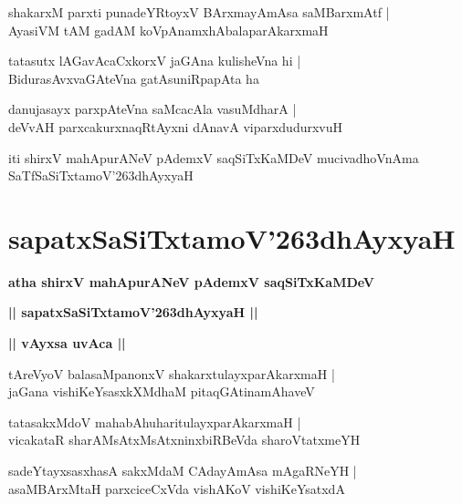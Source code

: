 \documentclass[twoside,12pt,openright]{book}
\def\S{\char'263}
\newcounter{shloka}[chapter]
\def\uvaca#1{\centerline{{\large\textbf{#1}}}}
\begin{document}
\begin{shloka}%
shakarxM parxti punadeYRtoyxV BArxmayAmAsa saMBarxmAtf |\\
AyasiVM tAM gadAM koVpAnamxhAbalaparAkarxmaH 
\end{shloka}

\begin{shloka}%
tatasutx lAGavAcaCxkorxV jaGAna kulisheVna hi |\\
BidurasAvxvaGAteVna gatAsuniRpapAta ha 
\end{shloka}

\begin{shloka}%
danujasayx parxpAteVna saMcacAla vasuMdharA |\\
deVvAH parxcakurxnaqRtAyxni dAnavA viparxdudurxvuH 
\end{shloka}

\begin{center}
iti shirxV mahApurANeV pAdemxV saqSiTxKaMDeV mucivadhoVnAma SaTfSaSiTxtamoV\S dhAyxyaH 
\end{center}

\chapter{sapatxSaSiTxtamoV\S dhAyxyaH}

\begin{center}
{\LARGE\bfseries atha shirxV mahApurANeV pAdemxV saqSiTxKaMDeV}
\end{center}

\begin{center}
{\LARGE\bfseries || sapatxSaSiTxtamoV\S dhAyxyaH || }
\end{center}

\uvaca{|| vAyxsa uvAca ||}

\begin{shloka}%
tAreVyoV balasaMpanonxV shakarxtulayxparAkarxmaH |\\
jaGana vishiKeYsasxkXMdhaM pitaqGAtinamAhaveV 
\end{shloka}

\begin{shloka}%
tatasakxMdoV mahabAhuharitulayxparAkarxmaH |\\
vicakataR sharAMsAtxMsAtxninxbiRBeVda sharoVtatxmeYH
\end{shloka}

\begin{shloka}%
sadeYtayxsasxhasA sakxMdaM CAdayAmAsa mAgaRNeYH |\\
asaMBArxMtaH parxciceCxVda vishAKoV vishiKeYsatxdA 
\end{shloka}
\end{document}
